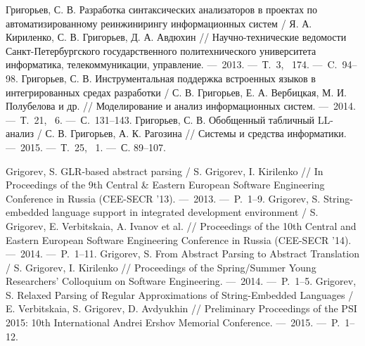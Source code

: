 \begin{thebibliography}{99}

 Григорьев, С. В. Разработка синтаксических анализаторов в проектах по автоматизированному реинжинирингу информационных систем / Я. А. Кириленко, С. В. Григорьев, Д. А. Авдюхин // Научно-технические ведомости Санкт-Петербургского государственного политехнического университета информатика, телекоммуникации, управление. ---~2013. ---~Т.~3, \textnumero~174. ---~C.~94--98.
 Григорьев, С. В. Инструментальная поддержка встроенных языков в интегрированных средах разработки / С. В. Григорьев, Е. А. Вербицкая, М. И. Полубелова и др. // Моделирование и анализ информационных систем. ---~2014. ---~Т.~21, \textnumero~6.  ---~С.~131--143.
 Григорьев, С. В. Обобщенный табличный LL-анализ / С. В. Григорьев, А. К. Рагозина // Системы и средства информатики. ---~2015. ---~Т.~25, \textnumero~1.  ---~С. 89--107. 

 Grigorev, S. GLR-based abstract parsing / S. Grigorev, I. Kirilenko // In Proceedings of the 9th Central \& Eastern European Software Engineering Conference in Russia (CEE-SECR ’13). ---~2013. ---~P.~1--9.
 Grigorev, S. String-embedded language support in integrated development environment / S. Grigorev, E. Verbitskaia, A. Ivanov et al. // Proceedings of the 10th Central and Eastern European Software Engineering Conference in Russia (CEE-SECR '14). ---~2014. ---~P.~1--11.
 Grigorev, S. From Abstract Parsing to Abstract Translation / S. Grigorev, I. Kirilenko // Proceedings of the Spring/Summer Young Researchers' Colloquium on Software Engineering. ---~2014. ---~P.~1--5.
 Grigorev, S. Relaxed Parsing of Regular Approximations of String-Embedded Languages / E. Verbitskaia, S. Grigorev, D. Avdyukhin // Preliminary Proceedings of the PSI 2015: 10th International Andrei Ershov Memorial Conference. ---~2015. ---~P.~1--12.

\end{thebibliography}
